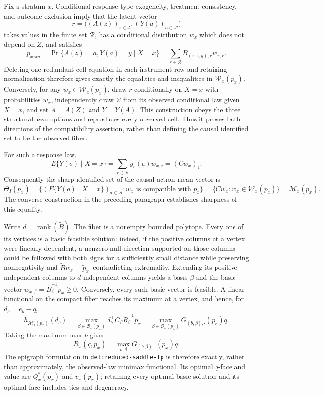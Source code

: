 Fix a stratum \(x\).  Conditional response-type exogeneity, treatment consistency, and outcome exclusion imply that the latent vector
\[
 r=\bigl((A(z))_{z\in\mathcal Z},(Y(a))_{a\in\mathcal A}\bigr)
\]
takes values in the finite set \(\mathcal R\), has a conditional distribution \(w_x\) which does not depend on \(Z\), and satisfies
\[
 p_{xzay}
 =\Pr\{A(z)=a,Y(a)=y\mid X=x\}
 =\sum_{r\in\mathcal R}B_{(z,a,y),r}w_{x,r}.
\]
Deleting one redundant cell equation in each instrument row and retaining normalization therefore gives exactly the equalities and inequalities in \(\mathcal W_x(p_x)\).  Conversely, for any \(w_x\in\mathcal W_x(p_x)\), draw \(r\) conditionally on \(X=x\) with probabilities \(w_x\), independently draw \(Z\) from its observed conditional law given \(X=x\), and set \(A=A(Z)\) and \(Y=Y(A)\).  This construction obeys the three structural assumptions and reproduces every observed cell.  Thus it proves both directions of the compatibility assertion, rather than defining the causal identified set to be the observed fiber.

For such a response law,
\[
 E\{Y(a)\mid X=x\}=\sum_{r\in\mathcal R}y_r(a)w_{x,r}=(Cw_x)_a.
\]
Consequently the sharp identified set of the causal action-mean vector is
\[
 \Theta_I(p_x)=\{(E\{Y(a)\mid X=x\})_{a\in\mathcal A}:w_x\text{ is compatible with }p_x\}
 =\{Cw_x:w_x\in\mathcal W_x(p_x)\}=\mathcal M_x(p_x).
\]
The converse construction in the preceding paragraph establishes sharpness of this equality.

Write \(d=\operatorname{rank}(\widetilde B)\).  The fiber is a nonempty bounded polytope.  Every one of its vertices is a basic feasible solution: indeed, if the positive columns at a vertex were linearly dependent, a nonzero null direction supported on those columns could be followed with both signs for a sufficiently small distance while preserving nonnegativity and \(\widetilde B w_x=\widetilde p_x\), contradicting extremality.  Extending its positive independent columns to \(d\) independent columns yields a basis \(\beta\) and the basic vector \(w_{x,\beta}=\widetilde B_\beta^{-1}\widetilde p_x\geq0\).  Conversely, every such basic vector is feasible.  A linear functional on the compact fiber reaches its maximum at a vertex, and hence, for \(d_b=e_b-q\),
\[
 h_{\mathcal M_x(p_x)}(d_b)
 =\max_{\beta\in\mathcal B_x(p_x)}d_b^\top C_\beta\widetilde B_\beta^{-1}\widetilde p_x
 =\max_{\beta\in\mathcal B_x(p_x)}G_{(b,\beta),\cdot}(p_x)q.
\]
Taking the maximum over \(b\) gives
\[
 R_x(q,p_x)=\max_{b,\beta}G_{(b,\beta),\cdot}(p_x)q.
\]
The epigraph formulation in \texttt{def:reduced-saddle-lp} is therefore exactly, rather than approximately, the observed-law minimax functional.  Its optimal \(q\)-face and value are \(Q_x^*(p_x)\) and \(v_x(p_x)\); retaining every optimal basic solution and its optimal face includes ties and degeneracy.

